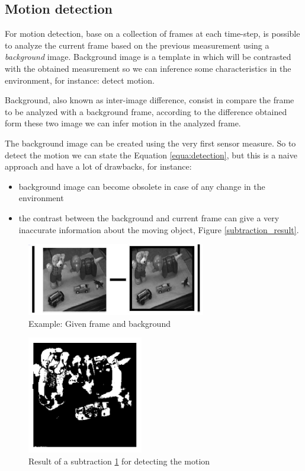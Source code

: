 \documentclass{article}
\begin{document}
\subsection{Motion detection}

For motion detection, base on a collection of frames at each time-step, is possible to analyze the current frame based on the previous measurement using a \emph{background} image. Background image is a template in which will be contrasted with the obtained measurement so we can inference some characteristics in the environment, for instance: detect motion.

Background, also known as inter-image difference, consist in compare the frame to be analyzed with a background frame, according to the difference obtained form these two image we can infer motion in the analyzed frame. 

The background image can be created using the very first sensor measure. So to detect the motion we can state the Equation \ref{equa:detection}, but this is a naive approach and have a lot of drawbacks, for instance:
\begin{itemize}
\item background image can become obsolete in case of any change in the environment
\item the contrast between the background and current frame can give a very inaccurate information about the moving object, Figure \ref{subtraction_result}.
\end{itemize}

\begin{figure}[H]
\includegraphics[scale=0.6]{image/subtraction.png}
\caption{Example: Given frame and background}
\label{fig:subtraction}
\end{figure}

\begin{figure}[H]
\includegraphics[scale=0.6]{image/subtraction_result.png}
\caption{Result of a subtraction \ref{fig:subtraction} for detecting the motion}
\label{fig:subtraction_result}
\end{figure}
\end{document}
